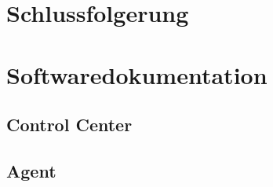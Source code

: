 \section{Schlussfolgerung}
\xxx

\section{Softwaredokumentation}
\xxx

\subsection*{Control Center}


\subsection*{Agent}

